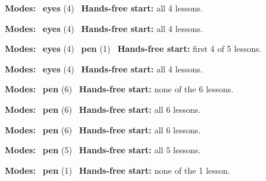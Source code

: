 \expandafter\def\csname hlchaptermodality15\endcsname{%
  {\small\noindent
    \textbf{Modes:} \hlsightsign{}~\textbf{eyes} (4)\quad
    \hlvoicesign{}~\textbf{Hands-free start:} all 4 lessons.%
    \par}\medskip
}

\expandafter\def\csname hlchaptermodality16\endcsname{%
  {\small\noindent
    \textbf{Modes:} \hlsightsign{}~\textbf{eyes} (4)\quad
    \hlvoicesign{}~\textbf{Hands-free start:} all 4 lessons.%
    \par}\medskip
}

\expandafter\def\csname hlchaptermodality17\endcsname{%
  {\small\noindent
    \textbf{Modes:} \hlsightsign{}~\textbf{eyes} (4) \quad \hlpensign{}~\textbf{pen} (1)\quad
    \hlvoicesign{}~\textbf{Hands-free start:} first 4 of 5 lessons.%
    \par}\medskip
}

\expandafter\def\csname hlchaptermodality18\endcsname{%
  {\small\noindent
    \textbf{Modes:} \hlsightsign{}~\textbf{eyes} (4)\quad
    \hlvoicesign{}~\textbf{Hands-free start:} all 4 lessons.%
    \par}\medskip
}

\expandafter\def\csname hlchaptermodality19\endcsname{%
  {\small\noindent
    \textbf{Modes:} \hlpensign{}~\textbf{pen} (6)\quad
    \hlvoicesign{}~\textbf{Hands-free start:} none of the 6 lessons.%
    \par}\medskip
}

\expandafter\def\csname hlchaptermodality20\endcsname{%
  {\small\noindent
    \textbf{Modes:} \hlpensign{}~\textbf{pen} (6)\quad
    \hlvoicesign{}~\textbf{Hands-free start:} all 6 lessons.%
    \par}\medskip
}

\expandafter\def\csname hlchaptermodality21\endcsname{%
  {\small\noindent
    \textbf{Modes:} \hlpensign{}~\textbf{pen} (6)\quad
    \hlvoicesign{}~\textbf{Hands-free start:} all 6 lessons.%
    \par}\medskip
}

\expandafter\def\csname hlchaptermodality22\endcsname{%
  {\small\noindent
    \textbf{Modes:} \hlpensign{}~\textbf{pen} (5)\quad
    \hlvoicesign{}~\textbf{Hands-free start:} all 5 lessons.%
    \par}\medskip
}

\expandafter\def\csname hlchaptermodality23\endcsname{%
  {\small\noindent
    \textbf{Modes:} \hlpensign{}~\textbf{pen} (1)\quad
    \hlvoicesign{}~\textbf{Hands-free start:} none of the 1 lesson.%
    \par}\medskip
}

